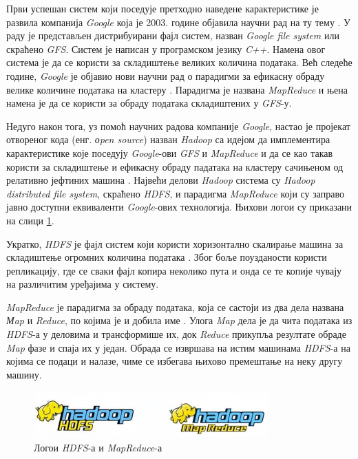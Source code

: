 \documentclass[12pt,oneside]{memoir}
\begin{document}
Први успешан систем који поседује претходно наведене карактеристике је развила компанија \textit{Google} која је 2003. године објавила научни рад на ту тему \cite{gfs}. У раду је представљен дистрибуирани фајл систем, назван \textit{Google file system} или скраћено \textit{GFS}. Систем је написан у програмском језику \textit{C++}. Намена овог система је да се користи за складиштење великих количина података. Већ следеће године, \textit{Google} је објавио нови научни рад о парадигми за ефикасну обраду велике количине података на кластеру \cite{gmr}. Парадигма је названа \textit{MapReduce} и њена намена је да се користи за обраду података складиштених у \textit{GFS}-у.

Недуго након тога, уз помоћ научних радова компаније \textit{Google}, настао је пројекат отвореног кода (енг. \textit{оpen source}) назван \textit{Hadoop} са идејом да имплементира карактеристике које поседују \textit{Google}-ови \textit{GFS} и \textit{MapReduce} и да се као такав користи за складиштење и ефикасну обраду падатака на кластеру сачињеном од релативно јефтиних машина \cite{hadoop_beginner}. Највећи делови \textit{Hadoop} система су \textit{Hadoop distributed file system}, скраћено \textit{HDFS}, и парадигма \textit{MapReduce} који су заправо јавно доступни еквиваленти \textit{Google}-ових технологија. Њихови логои су приказани на слици \ref{fig:hdfs_mr_logo}.

Укратко, \textit{HDFS} је фајл систем који користи хоризонтално скалирање машина за складиштење огромних количина података \cite{hadoop_beginner}. Због боље поузданости користи репликацију, где се сваки фајл копира неколико пута и онда се те копије чувају на различитим уређајима у систему.

\textit{MapReduce} је парадигма за обраду података, која се састоји из два дела названа \textit{Мap} и \textit{Reduce}, по којима је и добила име \cite{hadoop_beginner}. Улога \textit{Map} дела је да чита података из \textit{HDFS}-а у деловима и трансформише их, док \textit{Reduce} прикупља резултате обраде \textit{Map} фазе и спаја их у један. Обрада се извршава на истим машинама \textit{HDFS}-а на којима се подаци и налазе, чиме се избегава њихово премештање на неку другу машину.

\begin{figure}[!ht]
  \centering
  \includegraphics[width=0.8\textwidth]{pictures/hdfs_mr_logo.png}
  \caption{Логои \textit{HDFS}-а и \textit{MapReduce}-а}
  \label{fig:hdfs_mr_logo}
\end{figure}
\end{document}
